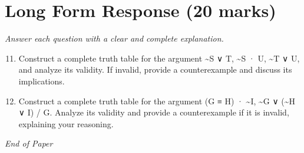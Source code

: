 \documentclass[12pt]{article}
\begin{document}
\section*{Long Form Response (20 marks)}
\textit{Answer each question with a clear and complete explanation.}
\begin{enumerate}[label=\arabic*.]
\setcounter{enumi}{10}
\item Construct a complete truth table for the argument \textasciitilde{}S ∨ T, \textasciitilde{}S · U, \textasciitilde{}T ∨ U, and analyze its
validity. If invalid, provide a counterexample and discuss its implications.
\item Construct a complete truth table for the argument (G ≡ H) · \textasciitilde{}I, \textasciitilde{}G ∨ (\textasciitilde{}H ∨ I) / G. Analyze
its validity and provide a counterexample if it is invalid, explaining your reasoning.
\end{enumerate}

\vfill
\noindent\textit{End of Paper}
\end{document}
